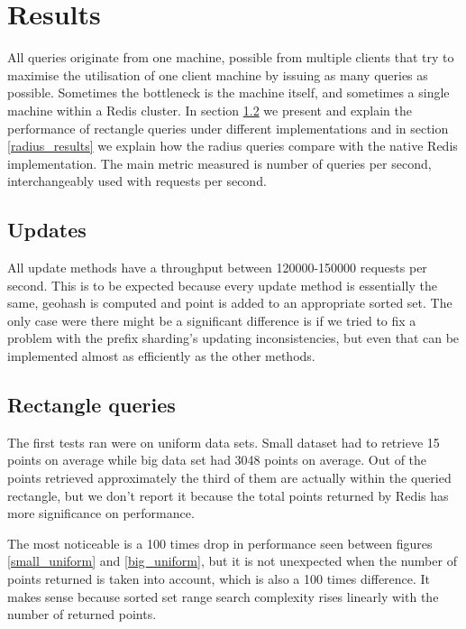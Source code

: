 \documentclass[times, utf8, diplomski]{fer}
\begin{document}
\chapter {Results}
All queries originate from one machine, possible from multiple clients that try to maximise the utilisation of one client machine by issuing as many queries as possible. Sometimes the bottleneck is the machine itself, and sometimes a single machine within a Redis cluster. In section \ref{rectangle_results} we present and explain the performance of rectangle queries under different implementations and in section \ref{radius_results} we explain how the radius queries compare with the native Redis implementation. The main metric measured is number of queries per second, interchangeably used with requests per second.

\section {Updates}
All update methods have a throughput between 120000-150000 requests per second. This is to be expected because every update method is essentially the same, geohash is computed and point is added to an appropriate sorted set. The only case were there might be a significant difference is if we tried to fix a problem with the prefix sharding's updating inconsistencies, but even that can be implemented almost as efficiently as the other methods.

\section {Rectangle queries} \label {rectangle_results}
The first tests ran were on uniform data sets. Small dataset had to retrieve 15 points on average while big data set had 3048 points on average. Out of the points retrieved approximately the third of them are actually within the queried rectangle, but we don't report it because the total points returned by Redis has more significance on performance. 

The most noticeable is a 100 times drop in performance seen between figures \ref{small_uniform} and \ref{big_uniform}, but it is not unexpected when the number of points returned is taken into account, which is also a 100 times difference. It makes sense because sorted set range search complexity rises linearly with the number of returned points.
\end{document}
